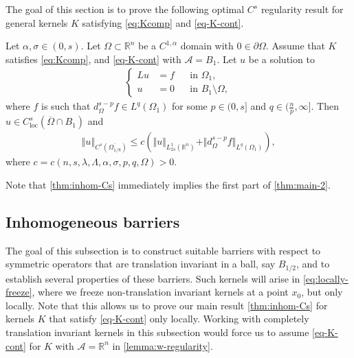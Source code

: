 \documentclass[11pt,reqno]{amsart}
\theoremstyle{plain}
\theoremstyle{definition}
\numberwithin{equation}{section}
\newcommand{\R}{\mathbb{R}}
\newcommand{\1}{\mathbbm{1}}
\begin{document}
The goal of this section is to prove the following optimal $C^s$ regularity result for general kernels $K$ satisfying \eqref{eq:Kcomp} and \eqref{eq-K-cont}.

\begin{theorem}
\label{thm:inhom-Cs}
Let $\alpha, \sigma \in (0,s)$. Let $\Omega \subset \R^n$ be a $C^{1, \alpha}$ domain with $0 \in \partial \Omega$. Assume that $K$ satisfies \eqref{eq:Kcomp}, and \eqref{eq-K-cont} with $\mathcal{A} = B_1$. 
Let $u$ be a solution to
\begin{align*}
\left\{
\begin{aligned}
Lu&=f &&\text{in }\Omega_1, \\
u&=0 &&\text{in } B_1 \setminus \Omega,
\end{aligned}
\right.
\end{align*}
where $f$ is such that $d_{\Omega}^{s-p}f \in L^q(\Omega_1)$ for some $p \in (0, s]$ and $q \in (\frac{n}{p},\infty]$. Then $u \in C^{s}_{\mathrm{loc}}(\overline{\Omega} \cap B_1)$ and
\begin{align*}
\left\Vert u \right\Vert_{C^{s}(\overline{\Omega_{1/8}})} \le c \left( \Vert u \Vert_{L^{1}_{2s}(\R^n)} + \Vert d^{s-p}_{\Omega} f \Vert_{L^q(\Omega_1)} \right),
\end{align*}
where $c=c(n,s,\lambda,\Lambda,\alpha,\sigma,p, q, \Omega) > 0$.
\end{theorem}

Note that \autoref{thm:inhom-Cs} immediately implies the first part of \autoref{thm:main-2}.

\subsection{Inhomogeneous barriers}

The goal of this subsection is to construct suitable barriers with respect to symmetric operators that are translation invariant in a ball, say $B_{1/2}$, and to establish several properties of these barriers. Such kernels will arise in \eqref{eq:locally-freeze}, where we freeze non-translation invariant kernels at a point $x_0$, but only locally. Note that this allows us to prove our main result \autoref{thm:inhom-Cs} for kernels $K$ that satisfy \eqref{eq-K-cont} only locally. Working with completely translation invariant kernels in this subsection would force us to assume \eqref{eq-K-cont} for $K$ with $\mathcal{A} = \R^n$ in \autoref{lemma:w-regularity}.
\end{document}
